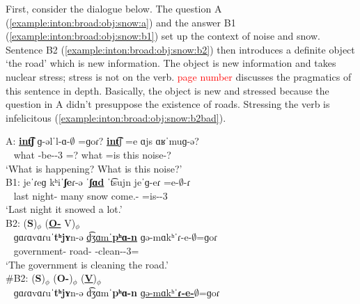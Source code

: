 First, consider the dialogue below. The question A (\ref{example:inton:broad:obj:snow:a}) and the answer B1  (\ref{example:inton:broad:obj:snow:b1}) set up the context of noise and snow. Sentence B2 (\ref{example:inton:broad:obj:snow:b2}) then introduces a definite object `the road' which is new information. The object is new information and takes nuclear stress; stress is not on the verb.   \citet{Nakipoglu-2009-SemanticsTurkishAccDefStress} \textcolor{red}{page number} discusses the pragmatics of this sentence in depth. Basically, the object is new and stressed because the question in A didn't presuppose the existence of roads. Stressing the verb is infelicitous (\ref{example:inton:broad:obj:snow:b2bad}). 


\begin{exe}
	\ex 
	\begin{xlist}
		
		\ex \gll A: \textbf{\underline{int͡}ʃ} ɡ-əlˈl-ɑ-$\emptyset$ =ɡoɾ? \underline{\textbf{int͡}}ʃ  =e  ɑjs ɑʁˈmuɡ-ə? \\
		~ what {\ind}-be-{\thgloss}-3{\sg} ={\prog}? what =is this noise-{}?\\ 
		\trans `What is happening? What is this noise?'\label{example:inton:broad:obj:snow:a}
		\\ 
		\ex \gll  B1: jeˈɾeɡ kʰiˈ\textbf{ʃe}ɾ-ə ˈ\textbf{\underline{ʃɑd}} ˈt͡sujn jeˈɡ-eɾ =e-$\emptyset$-ɾ\\
		~ last night-{} many snow come.{\aorother}-{\eptcp} =is-{\pst}-3{\sg} \\ 
		\trans `Last night it snowed a lot.' \label{example:inton:broad:obj:snow:b1}\\
		\ex \glll  B2:  (\textbf{S})$_\phi$ (\underline{\textbf{O-{}}} V)$_\phi$\\ ~ ɡɑɾɑvɑɾuˈ\textbf{tʰjʏ}n-ə \underline{d͡ʒɑmˈ\textbf{pʰɑ-n}}  ɡə-mɑkʰˈɾ-e-$\emptyset$=ɡoɾ  \\
		~ government-{} road-{} {\ind}-clean-{\thgloss}-3{\sg}={\prog}\\ 
		\trans `The government is cleaning the road.'\label{example:inton:broad:obj:snow:b2}
		\\ 
		\ex \gll  \#B2:  (\textbf{S})$_\phi$ ({\textbf{O-{}}})$_\phi$ (\underline{\textbf{V}})$_\phi$
		\\
		~   ɡɑɾɑvɑɾuˈ\textbf{tʰjʏ}n-ə  d͡ʒɑmˈ\textbf{pʰɑ-n}  \underline{ɡə-mɑkʰˈ\textbf{ɾ-e-$\emptyset$}}=ɡoɾ\\\label{example:inton:broad:obj:snow:b2bad}
		
	\end{xlist}
	
\end{exe}

